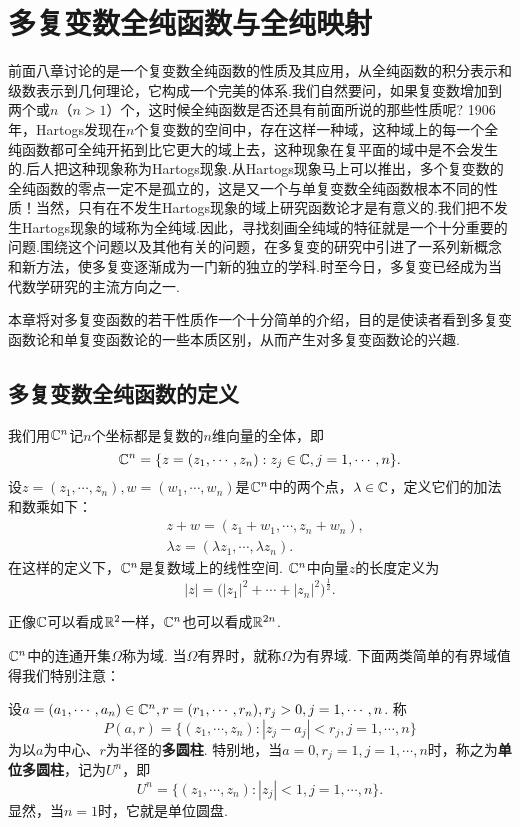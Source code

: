 \chapter{多复变数全纯函数与全纯映射\label{chap9}}
前面八章讨论的是一个复变数全纯函数的性质及其应用，从全纯函数的积分表示和级数表示到几何理论，它构成一个完美的体系.我们自然要问，如果复变数增加到两个或$n$（$n>1$）个，这时候全纯函数是否还具有前面所说的那些性质呢? 1906年，Hartogs发现在$n$个复变数的空间中，存在这样一种域，这种域上的每一个全纯函数都可全纯开拓到比它更大的域上去，这种现象在复平面的域中是不会发生的.后人把这种现象称为Hartogs现象.从Hartogs现象马上可以推出，多个复变数的全纯函数的零点一定不是孤立的，这是又一个与单复变数全纯函数根本不同的性质！当然，只有在不发生Hartogs现象的域上研究函数论才是有意义的.我们把不发生Hartogs现象的域称为全纯域.因此，寻找刻画全纯域的特征就是一个十分重要的问题.围绕这个问题以及其他有关的问题，在多复变的研究中引进了一系列新概念和新方法，使多复变逐渐成为一门新的独立的学科.时至今日，多复变已经成为当代数学研究的主流方向之一.

本章将对多复变函数的若干性质作一个十分简单的介绍，目的是使读者看到多复变函数论和单复变函数论的一些本质区别，从而产生对多复变函数论的兴趣.

\section{多复变数全纯函数的定义\label{sec9.1}}
我们用$\mathbb C^n$记$n$个坐标都是复数的$n$维向量的全体，即
\[
  \mathbb C^n = \{z=(z_1,\cdots,z_n):z_j\in\mathbb C,j=1,\cdots,n\}.
\]
设$z=(z_1,\cdots,z_n),w=(w_1,\cdots,w_n)$是$\mathbb C^n$中的两个点，$\lambda\in\mathbb C$，定义它们的加法和数乘如下：
\begin{align*}
  & z + w = (z_1+w_1,\cdots,z_n+w_n),\\
  & \lambda z = (\lambda z_1,\cdots,\lambda z_n).
\end{align*}
在这样的定义下，$\mathbb C^n$是复数域上的线性空间. $\mathbb C^n$中向量$z$的长度定义为
\[
  |z| = \big(|z_1|^2+\cdots+|z_n|^2\big)^{\frac12}.
\]

正像$\mathbb C$可以看成$\mathbb R^2$一样，$\mathbb C^n$也可以看成$\mathbb R^{2n}$.

$\mathbb C^n$中的连通开集$\Omega$称为域. 当$\Omega$有界时，就称$\Omega$为有界域.
下面两类简单的有界域值得我们特别注意：

设$a=(a_1,\cdots,a_n)\in\mathbb C^n,r=(r_1,\cdots,r_n),r_j>0,j=1,\cdots,n$. 称
\[
  P(a,r) = \{(z_1,\cdots,z_n):|z_j-a_j|<r_j,j=1,\cdots,n\}
\]
为以$a$为中心、$r$为半径的\textbf{多圆柱}. 特别地，当$a=0,r_j=1,j=1,\cdots,n$时，称之为\textbf{单位多圆柱}，记为$U^n$，即
\[
  U^n = \{(z_1,\cdots,z_n):|z_j|<1,j=1,\cdots,n\}.
\]
显然，当$n=1$时，它就是单位圆盘.


